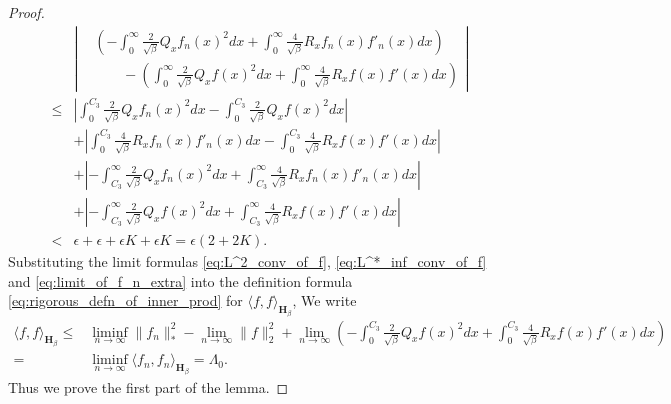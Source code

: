 \documentclass[11pt, a4paper]{article}
\numberwithin{equation}{section}
\newcommand{\Hbeta}{\mathbf{H}_{\beta}}
\theoremstyle{definition}
\theoremstyle{remark}
\begin{document}
\begin{proof}
  \begin{equation}
    \begin{split}
      & \left\lvert
        \begin{aligned}
          & \left( -\int^{\infty}_0 \frac{2}{\sqrt{\beta}} Q_x f_n(x)^2 dx + \int^{\infty}_0 \frac{4}{\sqrt{\beta}} R_x f_n(x)f'_n(x) dx \right) \\
          & \qquad - \left( \int^{\infty}_0 \frac{2}{\sqrt{\beta}} Q_x f(x)^2 dx + \int^{\infty}_0 \frac{4}{\sqrt{\beta}} R_x f(x)f'(x) dx \right)
        \end{aligned}
      \right\rvert \\
      \leq {}& \left\lvert \int^{C_3}_0 \frac{2}{\sqrt{\beta}} Q_x f_n(x)^2 dx - \int^{C_3}_0 \frac{2}{\sqrt{\beta}} Q_x f(x)^2 dx \right\rvert \\
      & + \left\lvert \int^{C_3}_0 \frac{4}{\sqrt{\beta}} R_x f_n(x)f'_n(x) dx - \int^{C_3}_0 \frac{4}{\sqrt{\beta}} R_x f(x)f'(x) dx \right\rvert \\
      & + \left\lvert -\int^{\infty}_{C_3} \frac{2}{\sqrt{\beta}} Q_x f_n(x)^2 dx + \int^{\infty}_{C_3} \frac{4}{\sqrt{\beta}} R_x f_n(x)f'_n(x) dx \right\rvert \\
      & + \left\lvert -\int^{\infty}_{C_3} \frac{2}{\sqrt{\beta}} Q_x f(x)^2 dx + \int^{\infty}_{C_3} \frac{4}{\sqrt{\beta}} R_x f(x)f'(x) dx \right\rvert \\
      < {}& \epsilon + \epsilon + \epsilon K + \epsilon K = \epsilon(2 + 2K).
    \end{split}
  \end{equation}
 Substituting the limit formulas \eqref{eq:L^2_conv_of_f}, \eqref{eq:L^*_inf_conv_of_f} and \eqref{eq:limit_of_f_n_extra} into the definition formula \eqref{eq:rigorous_defn_of_inner_prod} for $\langle f, f \rangle_{\Hbeta}$, We write
  \begin{equation}
    \begin{split}
      \langle f, f \rangle_{\Hbeta} \leq {}& \liminf_{n \to \infty} \lVert f_n \rVert^2_* - \lim_{n \to \infty} \lVert f \rVert^2_2 + \lim_{n \to \infty} \left( - \int^{C_3}_0 \frac{2}{\sqrt{\beta}} Q_x f(x)^2 dx + \int^{C_3}_0 \frac{4}{\sqrt{\beta}} R_x f(x)f'(x) dx \right) \\
      = {}& \liminf_{n \to \infty} \langle f_n, f_n \rangle_{\Hbeta} = \Lambda_0.
    \end{split}
  \end{equation}
  Thus we prove the first part of the lemma.


\end{proof}
\end{document}
